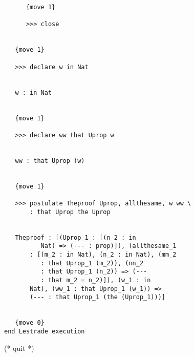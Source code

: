 \begin{verbatim}
      {move 1}

      >>> close


   {move 1}

   >>> declare w in Nat


   w : in Nat


   {move 1}

   >>> declare ww that Uprop w


   ww : that Uprop (w)


   {move 1}

   >>> postulate Theproof Uprop, allthesame, w ww \
       : that Uprop the Uprop


   Theproof : [(Uprop_1 : [(n_2 : in 
          Nat) => (--- : prop)]), (allthesame_1 
       : [(m_2 : in Nat), (n_2 : in Nat), (mm_2 
          : that Uprop_1 (m_2)), (nn_2 
          : that Uprop_1 (n_2)) => (--- 
          : that m_2 = n_2)]), (w_1 : in 
       Nat), (ww_1 : that Uprop_1 (w_1)) => 
       (--- : that Uprop_1 (the (Uprop_1)))]


   {move 0}
end Lestrade execution
\end{verbatim}





(* quit *)
